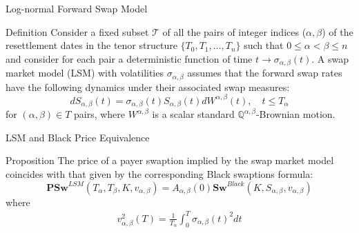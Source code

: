 \documentclass{beamer}
\begin{document}
\begin{frame}{Log-normal Forward Swap Model}
  \begin{block}{Definition}
    Consider a fixed subset $\mathcal{T}$ of all the pairs of integer indices ($\alpha, \beta$) of the resettlement dates in the tenor structure $\{T_0, T_1,\ldots, T_n\}$ such that $0 \leq \alpha < \beta \leq n$ and consider for each pair a deterministic function of time $t\rightarrow \sigma_{\alpha,\beta}(t)$. A swap market model (LSM) with volatilities $\sigma_{\alpha,\beta}$ assumes that the forward swap rates have the following dynamics under their associated swap measures:
    \begin{equation}
      dS_{\alpha,\beta}(t) = \sigma_{\alpha,\beta}(t)S_{\alpha,\beta}(t)dW^{\alpha,\beta}(t),\quad t \leq T_\alpha
      \label{eq:swap_rate_dynamics}
    \end{equation}
    for $(\alpha, \beta) \in T$ pairs, where $W^{\alpha,\beta}$ is a scalar standard $\mathbb{Q}^{\alpha,\beta}$-Brownian motion.
  \end{block}
\end{frame}

\begin{frame}{LSM and Black Price Equivalence}
  \begin{block}{Proposition}
    The price of a payer swaption implied by the swap market model coincides with that given by the corresponding Black swaptions formula:
    \begin{equation}
      \textbf{PSw}^{LSM}(T_\alpha,T_\beta,K,v_{\alpha,\beta})=
      A_{\alpha, \beta}(0) \textbf{Sw}^{Black}(K,S_{\alpha,\beta}, v_{\alpha,\beta})
      \label{eq:black_swaptions}
    \end{equation}
    where 
	\begin{equation*}    
		\begin{gathered}	 
   		v_{\alpha,\beta}^2(T) =\frac{1}{T_\alpha}\int_0^T\sigma_{\alpha,\beta}(t)^2dt 	
   		\end{gathered}
    \end{equation*}
  \end{block}
\end{frame}
\end{document}
